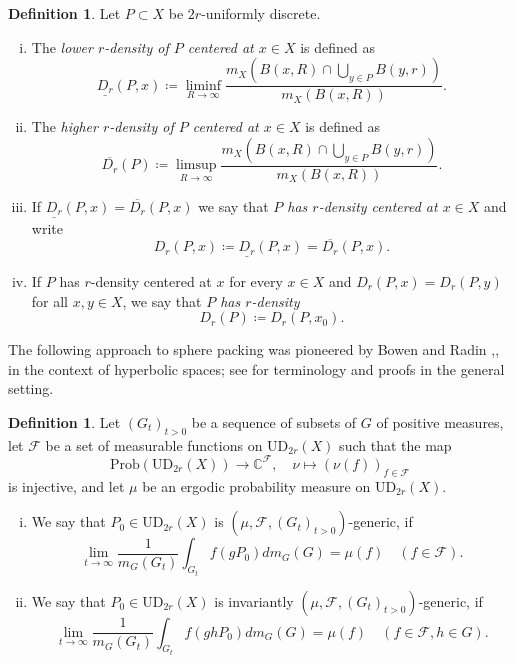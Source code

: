 \documentclass[12pt,reqno,a4paper]{amsart}
\theoremstyle{theorem}
\theoremstyle{definition}
\newtheorem{definition}[theorem]{Definition}
\numberwithin{theorem}{section}
\numberwithin{equation}{section}
\newcommand{\C}{\mathbb{C}}
\newcommand{\UD}{\mathrm{UD}}
\begin{document}
\begin{definition}
	Let $P\subset X$ be $2r$-uniformly discrete.
	\begin{enumerate}[(i)]
		\item The \emph{lower $r$-density of $P$ centered at $x\in X$} is defined as
		\[\underline{D_r}(P,x)\coloneqq \liminf_{R\to \infty}\frac{m_X(B(x,R)\cap \bigcup_{y\in P} B(y,r))}{m_X(B(x,R))}.\]
		\item The \emph{higher $r$-density of $P$ centered at $x\in X$} is defined as
		\[\overline{D_r}(P)\coloneqq \limsup_{R\to \infty}\frac{m_X(B(x,R)\cap \bigcup_{y\in P}B(y,r))}{m_X(B(x,R))}.\]
		\item If $\underline{D_r}(P,x) = \overline{D_r}(P,x)$ we say that \emph{$P$ has $r$-density centered at $x\in X$} and write 
		\[D_r(P,x)\coloneqq \underline{D_r}(P,x) = \overline{D_r}(P,x).\]
		\item If $P$ has $r$-density centered at $x$ for every $x\in X$ and $D_r(P,x)=D_r(P,y)$ for all $x,y\in X$, we say that \emph{$P$ has $r$-density}
		\[D_r(P) \coloneqq D_r(P,x_0).\]
	\end{enumerate}
\end{definition}
The following approach to sphere packing was pioneered by Bowen and Radin \cite{Bowen2003},\cite{Bowen2004}, in the context of hyperbolic spaces; see \cite{HartnickWackenhuthDensity} for terminology and proofs in the general setting.
\begin{definition}
	Let $(G_t)_{t>0}$ be a sequence of subsets of $G$ of positive measures, let $\mathcal{F}$ be a set of measurable functions on $\UD_{2r}(X)$ 
	such that the map \[
		\mathrm{Prob}(\UD_{2r}(X)) \to \C^\mathcal{F},\quad \nu \mapsto (\nu(f))_{f\in \mathcal F}
	\] is injective,
	and let $\mu$ be an ergodic probability measure on $\UD_{2r}(X)$.
	\begin{enumerate}[(i)]
		\item We say that $P_0\in \UD_{2r}(X)$ is $(\mu, \mathcal{F}, (G_t)_{t>0})$-generic, if 
			\[\lim_{t\to\infty} \frac{1}{m_G(G_t)}\int_{G_t}f(gP_0)dm_G(G) = \mu(f)\quad (f\in \mathcal{F}).\]
		\item We say that $P_0\in \UD_{2r}(X)$ is invariantly $(\mu, \mathcal{F}, (G_t)_{t>0})$-generic, if 
			\[\lim_{t\to\infty} \frac{1}{m_G(G_t)}\int_{G_t}f(ghP_0)dm_G(G) = \mu(f)\quad (f\in \mathcal{F}, h\in G).\]
	\end{enumerate}
\end{definition}
\end{document}
